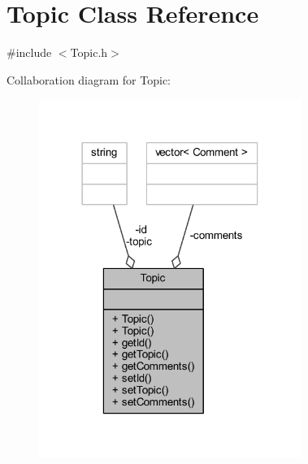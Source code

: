 \hypertarget{class_topic}{}\section{Topic Class Reference}
\label{class_topic}


{\ttfamily \#include $<$Topic.\+h$>$}



Collaboration diagram for Topic\+:\nopagebreak
\begin{figure}[H]
\begin{center}
\leavevmode
\includegraphics[width=242pt]{class_topic__coll__graph}
\end{center}
\end{figure}
